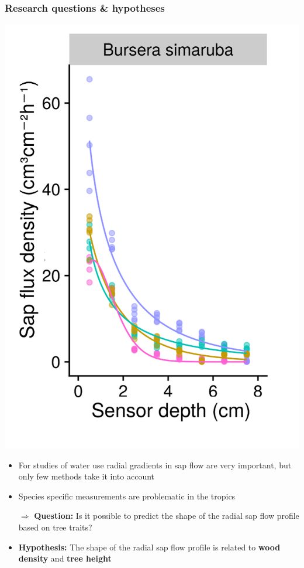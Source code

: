 \documentclass[usepdftitle=false]{beamer}
\newcommand{\Blue}[1]{{\color{blue!50!black}\textbf{#1}}}
\newcommand{\Rar}{$\Rightarrow$}
\newcommand{\tw}{\textwidth}
\begin{document}
\begin{frame}
	\frametitle{Research questions \& hypotheses}
	\begin{minipage}{0.38\tw}
		\includegraphics[width = \tw]{figures/HFD_05_profile_simarouba.png}
	\end{minipage}
	\begin{minipage}{0.6\tw}
			\begin{itemize}[<+-| alert@+>]
			\item For studies of water use radial gradients in sap flow are very important, but only few methods take it into account	
			\item Species specific measurements are problematic in the tropics		
			\item[\Rar] \Blue{Question:} Is it possible to predict the shape of the radial sap flow profile based on tree traits?
			\item<visible@+| alert@+>[\Rar] \Blue{Hypothesis:} The shape of the radial sap flow profile is related to \textbf{wood density} and \textbf{tree height}
		\end{itemize}						
	\end{minipage}

\end{frame}
\end{document}
